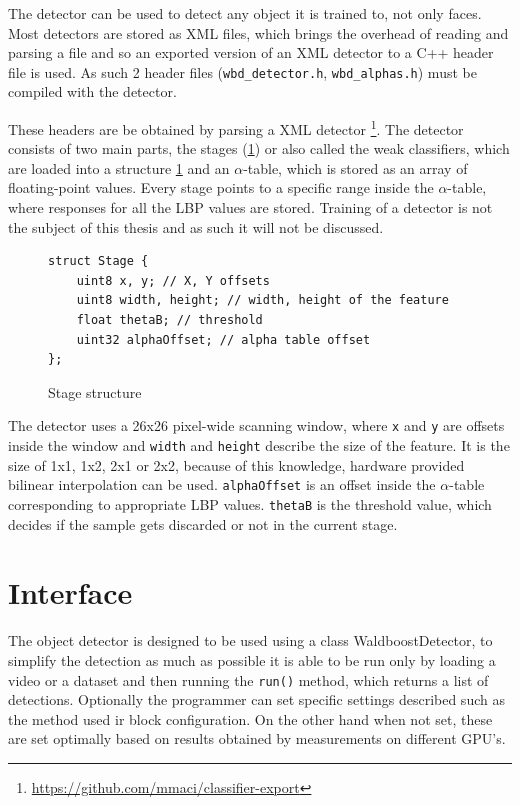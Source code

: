 The detector can be used to detect any object it is trained to, not only faces. Most detectors are stored as XML files, which brings the overhead of reading and parsing a file and so an exported version of an XML detector to a C++ header file is used. As such 2 header files (\verb|wbd_detector.h|, \verb|wbd_alphas.h|) must be compiled with the detector.

These headers are be obtained by parsing a XML detector \footnote{\url{https://github.com/mmaci/classifier-export}}. The detector consists of two main parts, the stages (\ref{fig:stage}) or also called the weak classifiers, which are loaded into a structure \ref{fig:stage} and an $\alpha$-table, which is stored as an array of floating-point values. Every stage points to a specific range inside the $\alpha$-table, where responses for all the LBP values are stored. Training of a detector is not the subject of this thesis and as such it will not be discussed.

\begin{figure}[h!]
\begin{verbatim}
struct Stage {
    uint8 x, y; // X, Y offsets
    uint8 width, height; // width, height of the feature
    float thetaB; // threshold
    uint32 alphaOffset; // alpha table offset
};
\end{verbatim}
\caption{Stage structure}
\label{fig:stage}
\end{figure}

The detector uses a 26x26 pixel-wide scanning window, where \verb|x| and \verb|y| are offsets inside the window and \verb|width| and \verb|height| describe the size of the feature. It is the size of 1x1, 1x2, 2x1 or 2x2, because of this knowledge, hardware provided bilinear interpolation can be used. \verb|alphaOffset| is an offset inside the $\alpha$-table corresponding to appropriate LBP values. \verb|thetaB| is the threshold value, which decides if the sample gets discarded or not in the current stage.

\section{Interface}

The object detector is designed to be used using a class WaldboostDetector, to simplify the detection as much as possible it is able to be run only by loading a video or a dataset and then running the \verb|run()| method, which returns a list of detections. Optionally the programmer can set specific settings described such as the method used ir block configuration. On the other hand when not set, these are set optimally based on results obtained by measurements on different GPU's.

